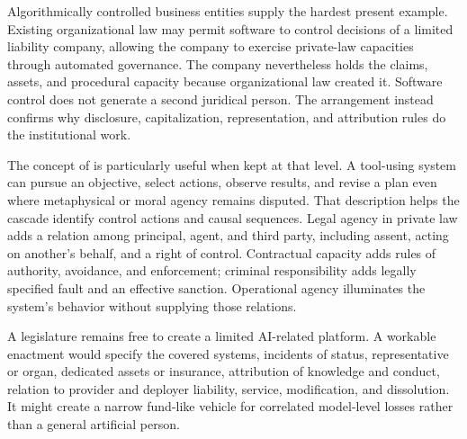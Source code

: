 Algorithmically controlled business entities supply the hardest present example. Existing organizational law may permit software to control decisions of a limited liability company, allowing the company to exercise private-law capacities through automated governance. The company nevertheless holds the claims, assets, and procedural capacity because organizational law created it. Software control does not generate a second juridical person. The arrangement instead confirms why disclosure, capitalization, representation, and attribution rules do the institutional work.

The concept of  is particularly useful when kept at that level. A tool-using system can pursue an objective, select actions, observe results, and revise a plan even where metaphysical or moral agency remains disputed. That description helps the cascade identify control actions and causal sequences. Legal agency in private law adds a relation among principal, agent, and third party, including assent, acting on another's behalf, and a right of control. Contractual capacity adds rules of authority, avoidance, and enforcement; criminal responsibility adds legally specified fault and an effective sanction. Operational agency illuminates the system's behavior without supplying those relations.

A legislature remains free to create a limited AI-related platform. A workable enactment would specify the covered systems, incidents of status, representative or organ, dedicated assets or insurance, attribution of knowledge and conduct, relation to provider and deployer liability, service, modification, and dissolution. It might create a narrow fund-like vehicle for correlated model-level losses rather than a general artificial person.

